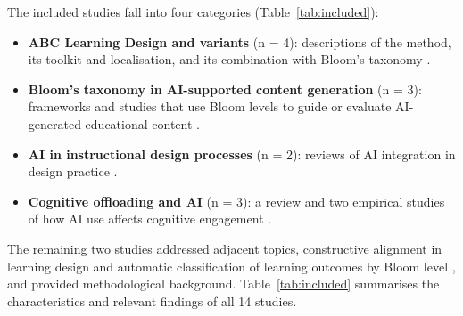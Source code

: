 \documentclass[journal,article,submit,pdftex,moreauthors]{Definitions/mdpi}
\begin{document}
The included studies fall into four categories (Table~\ref{tab:included}):
\begin{itemize}[leftmargin=*]
  \item \textbf{ABC Learning Design and variants} (n = 4): descriptions of the method, its toolkit and localisation, and its combination with Bloom's taxonomy \cite{young_perovic_2016, perovic_young_2020, kucina_softic_2022, marstio_2025}.
  \item \textbf{Bloom's taxonomy in AI-supported content generation} (n = 3): frameworks and studies that use Bloom levels to guide or evaluate AI-generated educational content \cite{yaacoub_oneclickquiz_2025, ieee_enhancing_2025, elkins_2024}.
  \item \textbf{AI in instructional design processes} (n = 2): reviews of AI integration in design practice \cite{qian_hassan_2025, xu_2025}.
  \item \textbf{Cognitive offloading and AI} (n = 3): a review and two empirical studies of how AI use affects cognitive engagement \cite{zhai_2024, gerlich_2025, fan_2025}.
\end{itemize}

The remaining two studies addressed adjacent topics, constructive alignment in learning design \cite{li_fishbone_2024} and automatic classification of learning outcomes by Bloom level \cite{shaikh_2021}, and provided methodological background. Table~\ref{tab:included} summarises the characteristics and relevant findings of all 14 studies.
\end{document}
